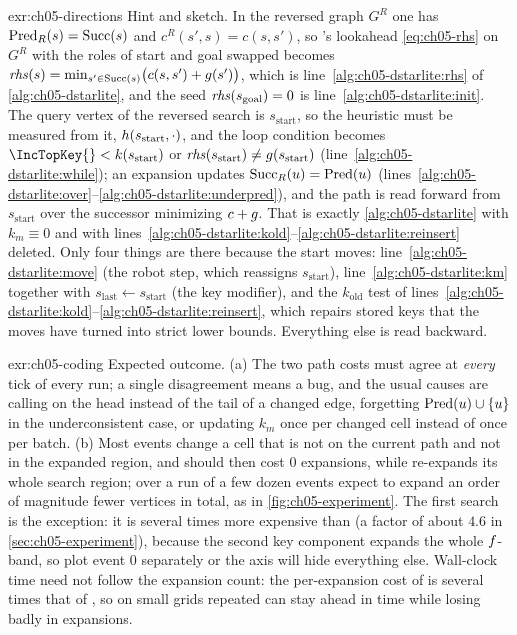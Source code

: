 \begin{solution}{exr:ch05-directions}
Hint and sketch. In the reversed graph $G^R$ one has $\operatorname{Pred}_R(s)=\operatorname{Succ}(s)$ and $c^R(s',s)=c(s,s')$, so \lpastar's lookahead \cref{eq:ch05-rhs} on $G^R$ with the roles of start and goal swapped becomes $\mathit{rhs}(s)=\min_{s'\in\operatorname{Succ}(s)}\bigl(c(s,s')+g(s')\bigr)$, which is line~\ref{alg:ch05-dstarlite:rhs} of \cref{alg:ch05-dstarlite}, and the seed $\mathit{rhs}(s_{\mathrm{goal}})=0$ is line~\ref{alg:ch05-dstarlite:init}. The query vertex of the reversed search is $s_{\mathrm{start}}$, so the heuristic must be measured from it, $h(s_{\mathrm{start}},\cdot)$, and the loop condition becomes $\IncTopKey{} < k(s_{\mathrm{start}})$ or $\mathit{rhs}(s_{\mathrm{start}})\neq g(s_{\mathrm{start}})$ (line~\ref{alg:ch05-dstarlite:while}); an expansion updates $\operatorname{Succ}_R(u)=\operatorname{Pred}(u)$ (lines~\ref{alg:ch05-dstarlite:over}--\ref{alg:ch05-dstarlite:underpred}), and the path is read forward from $s_{\mathrm{start}}$ over the successor minimizing $c+g$. That is exactly \cref{alg:ch05-dstarlite} with $k_m\equiv 0$ and with lines~\ref{alg:ch05-dstarlite:kold}--\ref{alg:ch05-dstarlite:reinsert} deleted. Only four things are there because the start moves: line~\ref{alg:ch05-dstarlite:move} (the robot step, which reassigns $s_{\mathrm{start}}$), line~\ref{alg:ch05-dstarlite:km} together with $s_{\mathrm{last}}\gets s_{\mathrm{start}}$ (the key modifier), and the $k_{\mathrm{old}}$ test of lines~\ref{alg:ch05-dstarlite:kold}--\ref{alg:ch05-dstarlite:reinsert}, which repairs stored keys that the moves have turned into strict lower bounds. Everything else is \lpastar read backward.
\end{solution}

\begin{solution}{exr:ch05-coding}
Expected outcome. (a) The two path costs must agree at \emph{every} tick of every run;
a single disagreement means a bug, and the usual causes are calling \DslUpdateVertex on
the head instead of the tail of a changed edge, forgetting $\operatorname{Pred}(u)\cup\left\{ u \right\}$ in the
underconsistent case, or updating $k_m$ once per changed cell instead of once per batch.
(b) Most events change a cell that is not on the current path and not in the expanded
region, and \dstarlite should then cost $0$ expansions, while \astar re-expands its
whole search region; over a run of a few dozen events expect \dstarlite to expand an
order of magnitude fewer vertices in total, as in \cref{fig:ch05-experiment}. The first
search is the exception: it is several times more expensive than \astar (a factor of
about $4.6$ in \cref{sec:ch05-experiment}), because the second key component expands the
whole $f$-band, so plot event $0$ separately or the axis will hide everything else.
Wall-clock time need not follow the expansion count: the per-expansion cost of
\dstarlite is several times that of \astar, so on small grids repeated \astar can stay
ahead in time while losing badly in expansions.
\end{solution}

